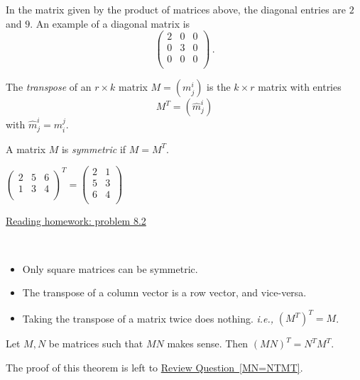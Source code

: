 In the matrix given by the product of matrices  above, the diagonal entries are $2$ and $9$.
An example of a diagonal matrix is 
\[\begin{pmatrix}
2 & 0 & 0\\
0 & 3 & 0\\
0 & 0 & 0\\
\end{pmatrix}\, .\]

\begin{definition}
The \emph{transpose} of an $r\times k$ matrix $M = (m_j^i)$ is the $k\times r$ matrix with entries
\[
M^T = (\hat{m}_j^i)
\]
with $\hat{m}_j^i = m_i^j$. 

A matrix $M$ is \emph{symmetric} if $M=M^T$.
\end{definition}

\begin{example}
$\begin{pmatrix}
2 & 5 & 6\\
1 & 3 & 4\\
\end{pmatrix}^T = 
\begin{pmatrix}
2 & 1 \\
5 & 3 \\
6 & 4 \\
\end{pmatrix}$
\end{example}

\begin{center}\href{\webworkurl ReadingHomework8/2/}{Reading homework: problem 8.2}\end{center}

\begin{remark}[Observations]

$\phantom{test}$

\begin{itemize}
\item Only square matrices can be symmetric.

\item The transpose of a column vector is a row vector, and vice-versa. 

\item Taking the transpose of a matrix twice does nothing.  \emph{i.e.,} $(M^T)^T=M$.
\end{itemize}
\end{remark}

\begin{theorem}
Let $M, N$ be matrices such that $MN$ makes sense.  Then $(MN)^T = N^TM^T$.
\end{theorem}
The proof of this theorem is left to \hyperref[MN=NTMT]{Review Question~\ref*{MN=NTMT}}.

